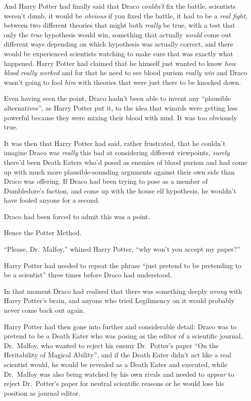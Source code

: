 And Harry Potter had finally said that Draco \emph{couldn't} fix the
battle, scientists weren't dumb, it would be \emph{obvious} if you fixed
the battle, it had to be a \emph{real fight,} between two different
theories that might both \emph{really} be true, with a test that only
the \emph{true} hypothesis would win, something that actually
\emph{would} come out different ways depending on which hypothesis was
actually correct, and there would be experienced scientists watching to
make sure that was exactly what happened. Harry Potter had claimed that
he himself just wanted to know \emph{how blood really worked} and for
that he need to see blood purism \emph{really win} and Draco wasn't
going to fool \emph{him} with theories that were just there to be
knocked down.

Even having seen the point, Draco hadn't been able to invent any
``plausible alternatives'', as Harry Potter put it, to the idea that
wizards were getting less powerful because they were mixing their blood
with mud. It was too obviously true.

It was then that Harry Potter had said, rather frustrated, that he
couldn't imagine Draco was \emph{really} this bad at considering
different viewpoints, \emph{surely} there'd been Death Eaters who'd
posed as enemies of blood purism and had come up with much more
plausible-sounding arguments against their own side than Draco was
offering. If Draco had been trying to pose as a member of Dumbledore's
faction, and come up with the house elf hypothesis, he wouldn't have
fooled anyone for a second.

Draco had been forced to admit this was a point.

Hence the Potter Method.

``Please, Dr.~Malfoy,'' whined Harry Potter, ``why won't you accept my
paper?''

Harry Potter had needed to repeat the phrase ``just pretend to be
pretending to be a scientist'' three times before Draco had understood.

In that moment Draco had realised that there was something deeply
\emph{wrong} with Harry Potter's brain, and anyone who tried Legilimency
on it would probably never come back out again.

Harry Potter had then gone into further and considerable detail: Draco
was to pretend to be a Death Eater who was posing as the editor of a
scientific journal, Dr.~Malfoy, who wanted to reject his enemy
Dr.~Potter's paper ``On the Heritability of Magical Ability'', and if
the Death Eater didn't act like a real scientist would, he would be
revealed as a Death Eater and executed, while Dr.~Malfoy was also being
watched by his own rivals and needed to \emph{appear} to reject
Dr.~Potter's paper for neutral scientific reasons or he would lose his
position as journal editor.


